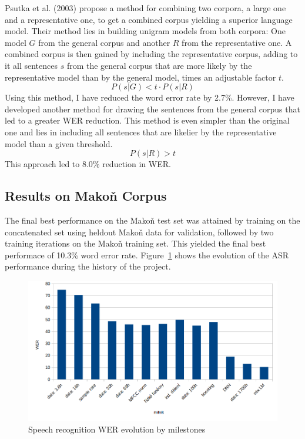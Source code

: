 \documentclass[hidelinks,12pt,a4paper]{report}
\begin{document}
Psutka et al. (2003)\cite{psutka2003large} propose a method for combining
two corpora, a large one and a representative one, to get a combined corpus yielding
a superior language model. Their method lies in building unigram models from
both corpora: One model $G$ from the general corpus and another $R$ from the
representative one. A combined corpus is then gained by including the
representative corpus, adding to it all sentences $s$ from the general corpus that are
more likely by the representative model than by the general model, times an
adjustable factor $t$.
\begin{equation}
P(s|G) < t\cdot{}P(s|R)
\end{equation}
Using this method, I have reduced the word error rate by 2.7\%. However, I have
developed another method for drawing the sentences from the general corpus that
led to a greater WER reduction. This method is even simpler than the original
one and lies in including all sentences that are likelier by the representative
model than a given threshold.
\begin{equation}
P(s|R) > t
\end{equation}
This approach led to 8.0\% reduction in WER.

\subsection{Results on Makoň Corpus}

The final best performance on the Makoň test set was attained by training on the
concatenated set using heldout Makoň data for validation, followed by two
training iterations on the Makoň training set. This yielded the final best
performace of 10.3\% word error rate. Figure~\ref{fig:asrhist} shows the
evolution of the ASR performance during the history of the project.

\begin{figure}[htpb]
\includegraphics[scale=0.43]{rc/asrhist.png}
\caption{
  Speech recognition WER evolution by milestones
}
\label{fig:asrhist}
\end{figure}
\end{document}
